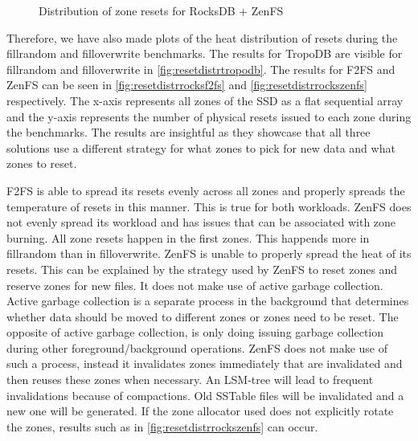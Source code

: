 \begin{figure}[!ht]
    \hspace*{-0.075\textwidth} %
    \raggedleft
    \caption{ Distribution of zone resets for RocksDB + ZenFS }
    \label{fig:resetdistrrockszenfs}
\end{figure}


Therefore, we have also made plots of the heat distribution of resets during the fillrandom and filloverwrite benchmarks. The results for TropoDB are visible for fillrandom and filloverwrite in \autoref{fig:resetdistrtropodb}.  The results for F2FS and ZenFS can be seen in \autoref{fig:resetdistrrocksf2fs} and \autoref{fig:resetdistrrockszenfs} respectively. The x-axis represents all zones of the SSD as a flat sequential array and the y-axis represents the number of physical resets issued to each zone during the benchmarks. The results are insightful as they showcase that all three solutions use a different strategy for what zones to pick for new data and what zones to reset. 

F2FS is able to spread its resets evenly across all zones and properly spreads the temperature of resets in this manner. This is true for both workloads. ZenFS does not evenly spread its workload and has issues that can be associated with zone burning. All zone resets happen in the first zones. This happends more in fillrandom than in filloverwrite. ZenFS is unable to properly spread the heat of its resets. This can be explained by the strategy used by ZenFS to reset zones and reserve zones for new files. It does not make use of active garbage collection. Active garbage collection is a separate process in the background that determines whether data should be moved to different zones or zones need to be reset. The opposite of active garbage collection, is only doing issuing garbage collection during other foreground/background operations.  ZenFS does not make use of such a process, instead it invalidates zones immediately that are invalidated and then reuses these zones when necessary. An LSM-tree will lead to frequent invalidations because of compactions. Old SSTable files will be invalidated and a new one will be generated. If the zone allocator used does not explicitly rotate the zones, results such as in \autoref{fig:resetdistrrockszenfs} can occur.

